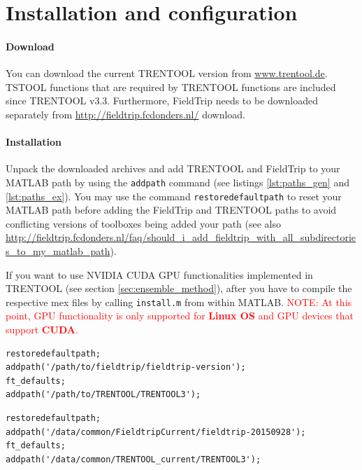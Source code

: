 \documentclass[a4paper,10pt]{article}
\begin{document}
\newpage
\section{Installation and configuration} \label{sec:installation}

\paragraph*{Download} You can download the current TRENTOOL version from \url{www.trentool.de}. TSTOOL functions that are required by TRENTOOL functions are included since TRENTOOL v3.3. Furthermore, FieldTrip needs to be downloaded separately from \url{http://fieldtrip.fcdonders.nl/} download.

\paragraph*{Installation} Unpack the downloaded archives and add TRENTOOL and FieldTrip to your MATLAB path by using the \verb&addpath& command (see listings \ref{lst:paths_gen} and \ref{lst:paths_ex}). You may use the command \verb&restoredefaultpath& to reset your MATLAB path before adding the FieldTrip and TRENTOOL paths to avoid conflicting versions of toolboxes being added your path (see also \url{http://fieldtrip.fcdonders.nl/faq/should_i_add_fieldtrip_with_all_subdirectories_to_my_matlab_path}). %

If you want to use NVIDIA CUDA GPU functionalities implemented in TRENTOOL (see section \ref{sec:ensemble_method}), after you have to compile the respective mex files by calling \texttt{install.m} from within MATLAB. \textcolor{red}{NOTE: At this point, GPU functionality is only supported for \textbf{Linux OS} and GPU devices that support \textbf{CUDA}.}

\begin{lstlisting}
restoredefaultpath;
addpath('/path/to/fieldtrip/fieldtrip-version');
ft_defaults;
addpath('/path/to/TRENTOOL/TRENTOOL3');
\end{lstlisting}

\begin{lstlisting}
restoredefaultpath;
addpath('/data/common/FieldtripCurrent/fieldtrip-20150928');
ft_defaults;
addpath('/data/common/TRENTOOL_current/TRENTOOL3');
\end{lstlisting}
\end{document}
